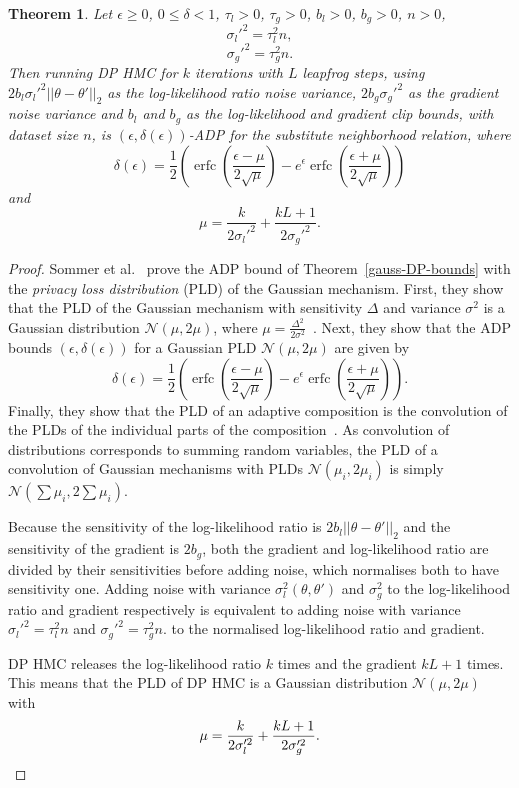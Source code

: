 \documentclass[english,twoside,openright]{HYgraduMLDS}
\newtheorem{theorem}{Theorem}
\newcommand{\caln}{{\mathcal{N}}}
\DeclareMathOperator{\erfc}{erfc}
\begin{document}
\begin{theorem}\label{dp_hmc_theorem_adp}
  Let \(\epsilon \geq 0\), \(0 \leq \delta < 1\), \(\tau_{l} > 0\),
  \(\tau_{g} > 0\), \(b_{l} > 0\), \(b_{g} > 0\), \(n > 0\),
  \[
    \sigma_{l}'^{2} = \tau_{l}^{2}n,
  \]
  \[
    \sigma_{g}'^{2} = \tau_{g}^{2}n.
  \]
  Then running DP HMC for \(k\) iterations with \(L\) leapfrog steps,
  using \(2b_{l}\sigma_{l}'^{2}||\theta - \theta'||_{2}\) as the log-likelihood ratio
  noise variance, \(2b_{g}\sigma_{g}'^{2}\) as the gradient noise variance
  and \(b_{l}\) and \(b_{g}\) as the log-likelihood and gradient clip bounds,
  with dataset size \(n\), is \((\epsilon, \delta(\epsilon))\)-ADP for the
  substitute neighborhood relation, where
  \[
    \delta(\epsilon) = \frac{1}{2}\left(
      \erfc\left(\frac{\epsilon - \mu}{2\sqrt{\mu}}\right)
      - e^{\epsilon}\erfc\left(\frac{\epsilon + \mu}{2\sqrt{\mu}}\right)\right)
  \]
  and
  \[
    \mu = \frac{k}{2\sigma_{l}'^{2}} + \frac{kL + 1}{2\sigma_{g}'^{2}}.
  \]
\end{theorem}
\begin{proof}
Sommer et al.~\cite{Sommer2019} prove the ADP bound of Theorem~\ref{gauss-DP-bounds} with
the \emph{privacy loss distribution} (PLD) of the Gaussian mechanism. First, they
show that the PLD of the Gaussian mechanism with sensitivity \(\Delta\) and variance
\(\sigma^{2}\) is a Gaussian distribution
\(\caln(\mu, 2\mu)\), where \(\mu = \frac{\Delta^{2}}{2\sigma^{2}}\)~\cite[Lemma 11]{Sommer2019}.
Next, they show that the ADP bounds \((\epsilon, \delta(\epsilon))\) for a
Gaussian PLD \(\caln(\mu, 2\mu)\) are given by~\cite[Lemma 12]{Sommer2019}
\[
  \delta(\epsilon) = \frac{1}{2}\left(
    \erfc\left(\frac{\epsilon - \mu}{2\sqrt{\mu}}\right)
    - e^{\epsilon}\erfc\left(\frac{\epsilon + \mu}{2\sqrt{\mu}}\right)\right).
\]
Finally, they show that the PLD of an adaptive composition is the convolution of
the PLDs of the individual parts of the composition~\cite[Theorem 1]{Sommer2019}.
As convolution of distributions corresponds to summing random variables, the PLD of a
convolution of Gaussian mechanisms with PLDs \(\caln(\mu_{i}, 2\mu_{i})\) is
simply \(\caln(\sum \mu_{i}, 2\sum \mu_{i})\).

Because the sensitivity of the log-likelihood ratio is
\(2b_{l}||\theta - \theta'||_{2}\) and the sensitivity of the gradient is
\(2b_{g}\), both the gradient and log-likelihood ratio are divided by their
sensitivities before adding noise, which normalises both to have sensitivity
one. Adding noise with variance \(\sigma_{l}^2(\theta, \theta')\)
and \(\sigma_{g}^{2}\) to the log-likelihood ratio and gradient respectively
is equivalent to adding noise with variance
\(\sigma_{l}'^{2} = \tau_{l}^{2}n\) and \(\sigma_{g}'^{2} = \tau_{g}^{2}n\).
to the normalised log-likelihood ratio and gradient.

DP HMC releases the log-likelihood ratio \(k\) times and the gradient
\(kL + 1\) times. This means that the PLD of DP HMC is a Gaussian distribution
\(\caln(\mu, 2\mu)\) with
\[
  \mu = \frac{k}{2\sigma_{l}'^{2}} + \frac{kL + 1}{2\sigma_{g}'^{2}}.
  \qedhere
\]
\end{proof}
\end{document}
